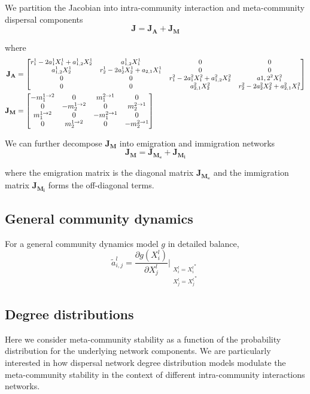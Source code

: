 \documentclass[12pt]{article}
\begin{document}
We partition the Jacobian into intra-community interaction and meta-community dispersal components
\[ \mathbf{J} = \mathbf{J_A} + \mathbf{J_M} \]

where
\begin{align*}
\mathbf{J_A} &= \small{\begin{bmatrix}
    r_1^1 - 2a_1^1X_1^1+a_{1,2}^1X_2^1 & a_{1,2}^1X_1^1 & 0 & 0 \\ 
    a_{1,2}^1X_2^1 & r_2^1 - 2a_2^1X_2^1 + a_{2,1}X_1^1 & 0 & 0 \\
    0 & 0 & r_1^2 -2a_1^2X_1^2 + a_{1,2}^2X_2^2  & a{1,2}^2X_1^2 \\
    0 & 0 & a_{2,1}^2X_2^2 & r_2^2 - 2a_2^2X_2^2 + a_{2,1}^2X_1^2 \\       
\end{bmatrix}} \\
 \mathbf{J_M} &= \begin{bmatrix}
    -m_1^{1\rightarrow 2} & 0 & m_1^{2\rightarrow 1} & 0 \\ 
    0 & -m_2^{1\rightarrow 2}& 0 & m_2^{2\rightarrow 1} \\
    m_1^{1\rightarrow 2} & 0 & -m_1^{2\rightarrow 1} & 0 \\
    0 & m_2^{1\rightarrow 2} & 0 & -m_2^{2\rightarrow 1} \\       
\end{bmatrix} 
\end{align*}

We can further decompose $\mathbf{J_M}$ into emigration and immigration networks
\[ \mathbf{J_M} = \mathbf{J_{M_e}} + \mathbf{J_{M_i}} \] 

where the emigration matrix is the diagonal matrix $\mathbf{J_{M_e}}$ and the immigration matrix $\mathbf{J_{M_i}}$ forms the off-diagonal terms. 

\subsection*{General community dynamics}
For a general community dynamics model $g$ in detailed balance, 
\[ \tilde{a}_{i,j}^l = \frac{\partial g(X_i^l)}{\partial X_j^l}\Bigr|_{\substack{{X_i^l=X_i^l}^*\\{X_j^l=X_j^l}^*}}  \]

\subsection*{Degree distributions}
Here we consider meta-community stability as a function of the probability distribution for the underlying network components. We are particularly interested in how dispersal network degree distribution models modulate the meta-community stability in the context of different intra-community interactions networks.
\end{document}
